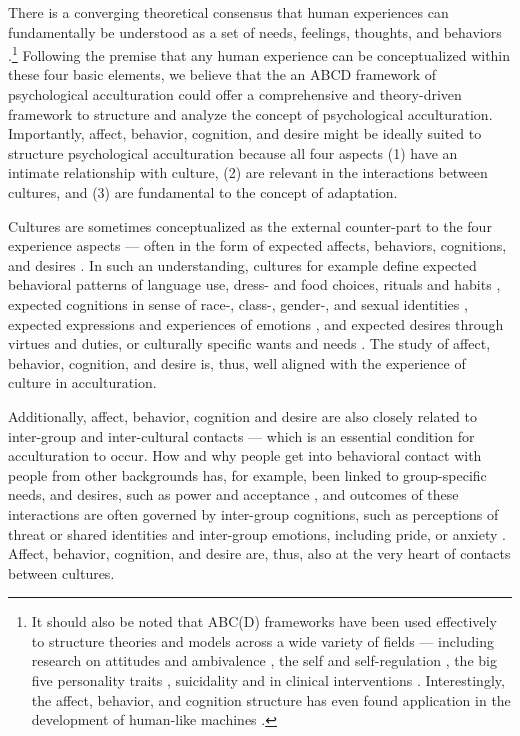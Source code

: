 \documentclass[man, 12pt, a4paper]{apa7}
\begin{document}
There is a converging theoretical consensus that human experiences can fundamentally be understood as a set of needs, feelings, thoughts, and behaviors \citep[sometimes referred to as the ABCs or ABCDs of psychology: affect, behavior, cognition, desire; e.g.,][]{Cottam2010, Hogg2005, Jhangiani2014}.\footnote{It should also be noted that ABC(D) frameworks have been used effectively to structure theories and models across a wide variety of fields --- including research on attitudes \citep{Breckler1984} and ambivalence \citep{VanHarreveld2015}, the self \citep{Cote2009} and self-regulation \citep{Ben-Eliyahu2015}, the big five personality traits \citep{Wilt2016}, suicidality \citep{Harris2015} and in clinical interventions \citep{Eifert1989}. Interestingly, the affect, behavior, and cognition structure has even found application in the development of human-like machines \citep{Guo2020}.} Following the premise that any human experience can be conceptualized within these four basic elements, we believe that the an ABCD framework of psychological acculturation could offer a comprehensive and theory-driven framework to structure and analyze the concept of psychological acculturation. Importantly, affect, behavior, cognition, and desire might be ideally suited to structure psychological acculturation because all four aspects (1) have an intimate relationship with culture, (2) are relevant in the interactions between cultures, and (3) are fundamental to the concept of adaptation.

Cultures are sometimes conceptualized as the external counter-part to the four experience aspects --- often in the form of expected affects, behaviors, cognitions, and desires \citep[][p. 52; on social facts]{Durkheim1982}. In such an understanding, cultures for example define expected behavioral patterns of language use, dress- and food choices, rituals and habits \citep[e.g.,][]{Legare2019, Whiting1980}, expected cognitions in sense of race-, class-, gender-, and sexual identities \citep[][]{Gelfand2011, Nisbett2002}, expected expressions and experiences of emotions \citep[][]{Holodynski2012, Boiger2018}, and expected desires through virtues and duties, or culturally specific wants and needs \citep[][]{McInerney2016, Morling2017}. The study of affect, behavior, cognition, and desire is, thus, well aligned with the experience of culture in acculturation.  

Additionally, affect, behavior, cognition and desire are also closely related to inter-group and inter-cultural contacts --- which is an essential condition for acculturation to occur. How and why people get into behavioral contact with people from other backgrounds \citep[e.g.,][]{Sam2010} has, for example, been linked to group-specific needs, and desires, such as power and acceptance \citep[e.g.,][]{Hassler2021, Shnabel2008a}, and outcomes of these interactions are often governed by inter-group cognitions, such as perceptions of threat or shared identities \citep[e.g.,][]{Dovidio2017, Stephan2000a} and inter-group emotions, including pride, or anxiety \citep[e.g.,][]{Iyer2008, Stephan1992}. Affect, behavior, cognition, and desire are, thus, also at the very heart of contacts between cultures.
\end{document}
